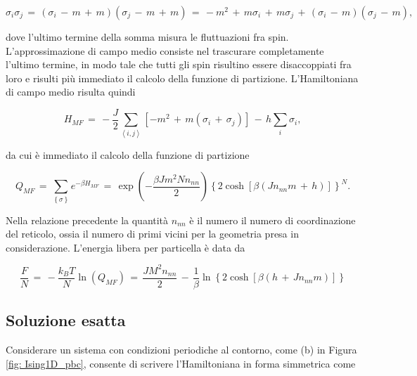 \begin{equation}
    \sigma_i \sigma_j\,=\,\left(\sigma_i\,-\,m\,+\,m\right)\left(\sigma_j\,-\,m\,+\,m\right)\,=\,-m^2\,+\,m\sigma_i\,+\,m\sigma_j\,+\,\left(\sigma_i\,-\,m\right)\left(\sigma_j\,-\,m\right),
    \label{eq: int_mf}
\end{equation}

dove l'ultimo termine della somma misura le fluttuazioni fra spin. L'approssimazione di campo medio consiste nel trascurare 
completamente l'ultimo termine, in modo tale che tutti gli spin risultino essere disaccoppiati fra loro e risulti più immediato il 
calcolo della funzione di partizione. L'Hamiltoniana di campo medio risulta quindi 

\begin{equation}
    H_{MF}\,=\,-\frac{J}{2} \sum_{\left<i,j\right>} \left[-m^2\,+\,m\left(\sigma_i\,+\,\sigma_j\right)\right]\,-\,h\sum_{i}\sigma_i,
    \label{eq: ham_mf}
\end{equation}

da cui è immediato il calcolo della funzione di partizione 

\begin{equation}
    Q_{MF}\,=\,\sum_{\left\{\sigma\right\}} e^{-\beta H_{MF}}\,=\,\exp{\left(-\frac{\beta J m^2 N n_{nn}}{2}\right)} \left\{2 \cosh{\left[\beta \left(J n_{nn} m\,+\,h\right)\right]}\right\}^N.
    \label{eq: part_MF_Ising1D}
\end{equation}

Nella relazione precedente la quantità $n_{nn}$ è il numero il numero di coordinazione del reticolo, ossia il numero di primi vicini per la 
geometria presa in considerazione. L'energia libera per particella è data da 

\begin{equation}
    \frac{F}{N}\,=\,-\frac{k_B T}{N} \ln{\left(Q_{MF}\right)}\,=\,\frac{JM^2n_{nn}}{2}\,-\,\frac{1}{\beta}\ln{\left\{2 \cosh{\left[\beta\left(h\,+\,Jn_{nn}m\right)\right]}\right\}}
    \label{eq: freeE_MF_Ising1D}
\end{equation}




\subsection{Soluzione esatta}

Considerare un sistema con condizioni periodiche al contorno, come (b) in Figura \ref{fig: Ising1D_pbc}, consente 
di scrivere l'Hamiltoniana in forma simmetrica come 

